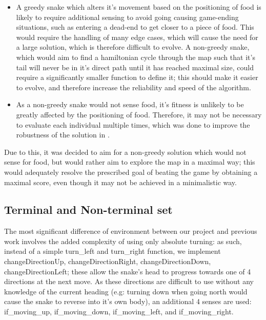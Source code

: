 \documentclass[british,10pt,a4paper]{article}
\begin{document}
\begin{itemize}
	\item A greedy snake which alters it's movement based on the positioning of food is likely to require additional sensing to avoid going causing game-ending situations, such as entering a dead-end to get closer to a piece of food. This would require the handling of many edge cases, which will cause the need for a large solution, which is therefore difficult to evolve. A non-greedy snake, which would aim to find a hamiltonian cycle through the map such that it's tail will never be in it's direct path until it has reached maximal size, could require a significantly smaller function to define it; this should make it easier to evolve, and therefore increase the reliability and speed of the algorithm.
	\item As a non-greedy snake would not sense food, it's fitness is unlikely to be greatly affected by the positioning of food. Therefore, it may not be necessary to evaluate each individual multiple times, which was done to improve the robustness of the solution in \cite{Ehlis2000-sz}.
\end{itemize}
Due to this, it was decided to aim for a non-greedy solution which would not sense for food, but would rather aim to explore the map in a maximal way; this would adequately resolve the prescribed goal of beating the game by obtaining a maximal score, even though it may not be achieved in a minimalistic way.



\subsection{Terminal and Non-terminal set}
\label{subsec:design_terminals}
The most significant difference of environment between our project and previous work involves the added complexity of using only absolute turning: as such, instead of a simple turn\_left and turn\_right function, we implement changeDirectionUp, changeDirectionRight, changeDirectionDown, changeDirectionLeft; these allow the snake's head to progress towards one of 4 directions at the next move. As these directions are difficult to use without any knowledge of the current heading (e.g: turning down when going north would cause the snake to reverse into it's own body), an additional 4 senses are used: if\_moving\_up, if\_moving\_down, if\_moving\_left, and if\_moving\_right. \newline
\end{document}
